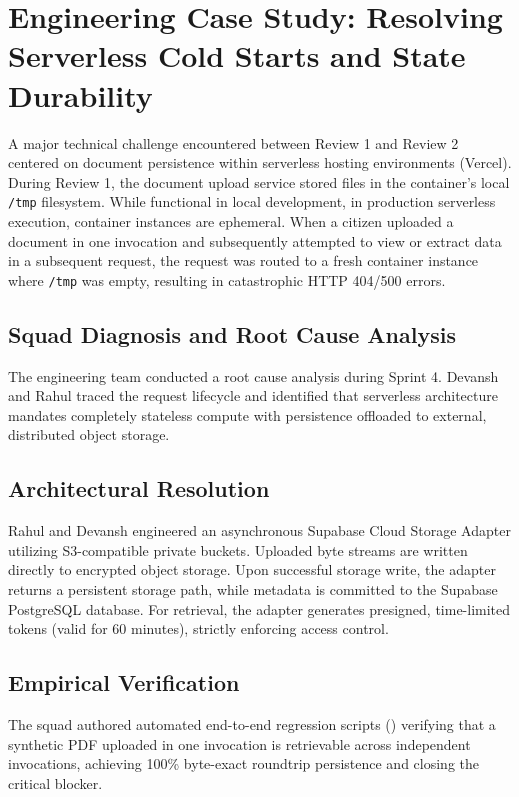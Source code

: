 \section{Engineering Case Study: Resolving Serverless Cold Starts and State Durability}
\label{sec:case_study}
A major technical challenge encountered between Review 1 and Review 2 centered on document persistence within serverless hosting environments (Vercel). During Review 1, the document upload service stored files in the container's local \texttt{/tmp} filesystem. While functional in local development, in production serverless execution, container instances are ephemeral. When a citizen uploaded a document in one invocation and subsequently attempted to view or extract data in a subsequent request, the request was routed to a fresh container instance where \texttt{/tmp} was empty, resulting in catastrophic HTTP 404/500 errors.

\subsection{Squad Diagnosis and Root Cause Analysis}
The engineering team conducted a root cause analysis during Sprint 4. Devansh and Rahul traced the request lifecycle and identified that serverless architecture mandates completely stateless compute with persistence offloaded to external, distributed object storage.

\subsection{Architectural Resolution}
Rahul and Devansh engineered an asynchronous Supabase Cloud Storage Adapter utilizing S3-compatible private buckets. Uploaded byte streams are written directly to encrypted object storage. Upon successful storage write, the adapter returns a persistent storage path, while metadata is committed to the Supabase PostgreSQL database. For retrieval, the adapter generates presigned, time-limited tokens (valid for 60 minutes), strictly enforcing access control.

\subsection{Empirical Verification}
The squad authored automated end-to-end regression scripts () verifying that a synthetic PDF uploaded in one invocation is retrievable across independent invocations, achieving 100\% byte-exact roundtrip persistence and closing the critical blocker.

